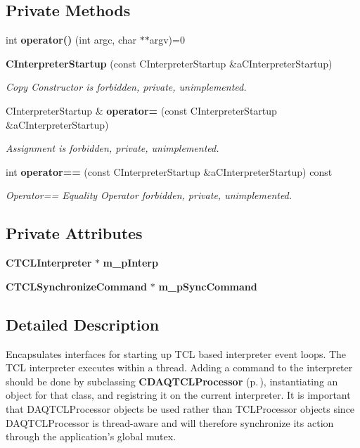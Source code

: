 \subsection*{Private Methods}
\begin{CompactItemize}
\item 
int {\bf operator()} (int argc, char $\ast$$\ast$argv)=0
\item 
{\bf CInterpreter\-Startup} (const CInterpreter\-Startup \&a\-CInterpreter\-Startup)
\begin{CompactList}\small\item\em Copy Constructor is forbidden, private, unimplemented.\item\end{CompactList}\item 
CInterpreter\-Startup \& {\bf operator=} (const CInterpreter\-Startup \&a\-CInterpreter\-Startup)
\begin{CompactList}\small\item\em Assignment is forbidden, private, unimplemented.\item\end{CompactList}\item 
int {\bf operator==} (const CInterpreter\-Startup \&a\-CInterpreter\-Startup) const
\begin{CompactList}\small\item\em Operator== Equality Operator forbidden, private, unimplemented.\item\end{CompactList}\end{CompactItemize}
\subsection*{Private Attributes}
\begin{CompactItemize}
\item 
{\bf CTCLInterpreter} $\ast$ {\bf m\_\-p\-Interp}
\item 
{\bf CTCLSynchronize\-Command} $\ast$ {\bf m\_\-p\-Sync\-Command}
\end{CompactItemize}


\subsection{Detailed Description}
Encapsulates interfaces for starting up  TCL based interpreter event loops. The TCL interpreter executes within a thread. Adding a command to the interpreter should be done by subclassing {\bf CDAQTCLProcessor} {\rm (p.\,\pageref{classCDAQTCLProcessor})}, instantiating an object for that class, and registring it on the current interpreter. It is important that DAQTCLProcessor objects be used rather than TCLProcessor objects since DAQTCLProcessor is thread-aware and will therefore synchronize its action through the application's global mutex. 



